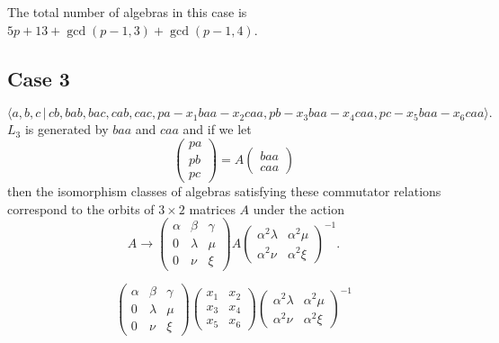 \documentclass[10pt,thmsa]{article}
\begin{document}
The total number of algebras in this case is $5p+13+\gcd (p-1,3)+\gcd
(p-1,4) $.

\subsection{Case 3}

\[
\langle
a,b,c\,|%
\,cb,bab,bac,cab,cac,pa-x_{1}baa-x_{2}caa,pb-x_{3}baa-x_{4}caa,pc-x_{5}baa-x_{6}caa\rangle . 
\]%
$L_{3}$ is generated by $baa$ and $caa$ and if we let 
\[
\left( 
\begin{array}{l}
pa \\ 
pb \\ 
pc%
\end{array}%
\right) =A\left( 
\begin{array}{l}
baa \\ 
caa%
\end{array}%
\right) 
\]%
then the isomorphism classes of algebras satisfying these commutator
relations correspond to the orbits of $3\times 2$ matrices $A$ under the
action 
\[
A\rightarrow \left( 
\begin{array}{lll}
\alpha & \beta & \gamma \\ 
0 & \lambda & \mu \\ 
0 & \nu & \xi%
\end{array}%
\right) A\left( 
\begin{array}{ll}
\alpha ^{2}\lambda & \alpha ^{2}\mu \\ 
\alpha ^{2}\nu & \alpha ^{2}\xi%
\end{array}%
\right) ^{-1}. 
\]

\[
\left( 
\begin{array}{lll}
\alpha & \beta & \gamma \\ 
0 & \lambda & \mu \\ 
0 & \nu & \xi%
\end{array}%
\right) \left( 
\begin{array}{cc}
x_{1} & x_{2} \\ 
x_{3} & x_{4} \\ 
x_{5} & x_{6}%
\end{array}%
\right) \left( 
\begin{array}{ll}
\alpha ^{2}\lambda & \alpha ^{2}\mu \\ 
\alpha ^{2}\nu & \alpha ^{2}\xi%
\end{array}%
\right) ^{-1} 
\]

$\allowbreak $ $\allowbreak $
\end{document}
